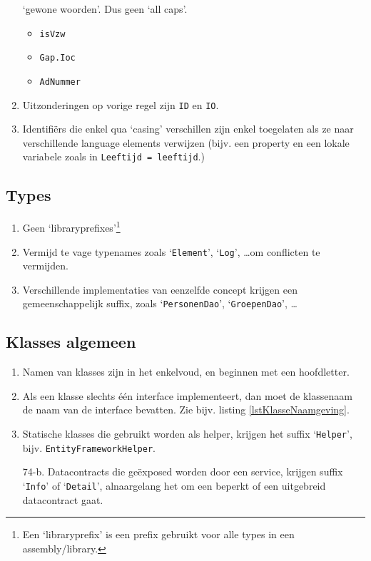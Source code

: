 \documentclass[a4paper,11pt]{article}
\begin{document}
\begin{enumerate}[resume]
`gewone woorden'.  Dus geen `all caps'.
\begin{itemize}
\item \lstinline !isVzw!
\item \lstinline !Gap.Ioc!
\item \lstinline !AdNummer!
\end{itemize}
\item Uitzonderingen op vorige regel zijn \lstinline !ID! en 
\lstinline !IO!.
\item Identifi\"ers die enkel qua `casing' verschillen zijn enkel
toegelaten als ze naar verschillende language elements verwijzen (bijv.
een property en een lokale variabele zoals in 
\lstinline !Leeftijd = leeftijd!.)
\end{enumerate}

\subsection{Types}

\begin{enumerate}[resume]
\item Geen `libraryprefixes'\footnote{Een `libraryprefix' is een prefix
gebruikt voor alle types in een assembly/library.}
\item Vermijd te vage typenames zoals `\lstinline !Element!',
`\lstinline !Log!', \ldots om conflicten te vermijden.
\item Verschillende implementaties van eenzelfde concept krijgen een
gemeenschappelijk suffix, zoals `\lstinline !PersonenDao!', `\lstinline !GroepenDao!', \ldots
\end{enumerate}

\subsection{Klasses algemeen}

\begin{enumerate}[resume]
\item Namen van klasses zijn in het enkelvoud, en beginnen met een hoofdletter.
\item Als een klasse slechts \'e\'en interface implementeert, dan moet de
klassenaam de naam van de interface bevatten.  Zie bijv. listing \ref{lstKlasseNaamgeving}.
\item Statische klasses die gebruikt worden als helper, krijgen het suffix
`\lstinline !Helper!', bijv. \lstinline !EntityFrameworkHelper!.
\item [74-b.] Datacontracts die ge\"exposed worden door een service, krijgen suffix `\lstinline !Info!' of `\lstinline !Detail!', alnaargelang het om een beperkt of een uitgebreid datacontract gaat.
\end{enumerate}
\end{document}
